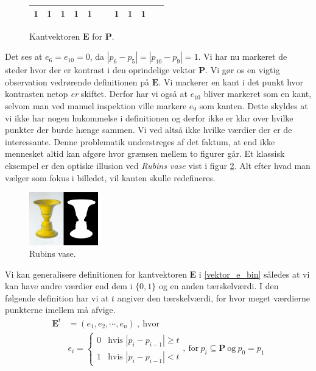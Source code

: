 {\begin{figure}[!h]
    \renewcommand{\arraystretch}{1.5}
    \centering
    \begin{tabular}{|c|c|c|c|c|c|c|c|c|c|}
        \hline
        1 & 1 & 1 & 1 & 1 & \cellcolor{black}\textcolor{white}{0} & 1 &
        1 & 1 & \cellcolor{black}\textcolor{white}{0} \\\hline
    \end{tabular}
    \caption[]{Kantvektoren $\mathbf{E}$ for $\mathbf{P}$.}
    \label{vektor_e_edge}
\end{figure}
Det ses at $e_6 = e_{10} = 0$, da $|p_6 - p_5| = |p_{10} - p_9| = 1$. Vi
har nu markeret de steder hvor der er kontrast i den oprindelige vektor
$\mathbf{P}$. Vi gør os en vigtig observation vedrørende definitionen på
$\mathbf{E}$. Vi markerer en kant i det punkt hvor kontrasten netop
\emph{er} skiftet. Derfor har vi også at $e_{10}$ bliver markeret som en
kant, selvom man ved manuel inspektion ville markere $e_9$ som kanten.
Dette skyldes at vi ikke har nogen hukommelse i definitionen og derfor
ikke er klar over hvilke punkter der burde hænge sammen. Vi ved altså
ikke hvilke værdier der er de interessante. Denne problematik
understreges af det faktum, at end ikke mennesket altid kan afgøre hvor
grænsen mellem to figurer går. Et klassisk eksempel er den optiske
illusion ved \emph{Rubins vase}\cite{WikiRubinVase} vist i figur
\ref{rubins_vase}. Alt efter hvad man vælger som fokus i billedet, vil
kanten skulle redefineres.

\begin{figure}[!h]
    \begin{center}
        \includegraphics[trim = 84mm 4mm 0mm 0mm, clip, width=3cm]{afsnit/vores_implementation/billeder/kantdetektion/Rubin2}
    \end{center}
    \caption[]{Rubins vase\cite{WikiRubinVasePic}.}
    \label{rubins_vase}
\end{figure}

Vi kan generalisere definitionen for kantvektoren $\mathbf{E}$ i
\ref{vektor_e_bin} således at vi kan have andre værdier end dem i
$\{0,1\}$ og en anden tærskelværdi. I den følgende definition har vi at
$t$ angiver den tærskelværdi, for hvor meget værdierne punkterne imellem
må afvige.
\begin{equation}
    \begin{split}
        \mathbf{E}^t &= (e_1, e_2, \cdots, e_n) \mathrm{~,~hvor~} \\
        &e_i = \left\{
        \begin{array}{rl}
            0 & \text{hvis~} |p_i - p_{i - 1}| \geq t\\
            1 & \text{hvis~} |p_i - p_{i - 1}| < t
        \end{array} \right. \mathrm{,~for~} p_i \subseteq \mathbf{P}
        \mathrm{~og~} p_0 = p_1
    \end{split}
    \label{vektor_e_generel}
\end{equation}

}

